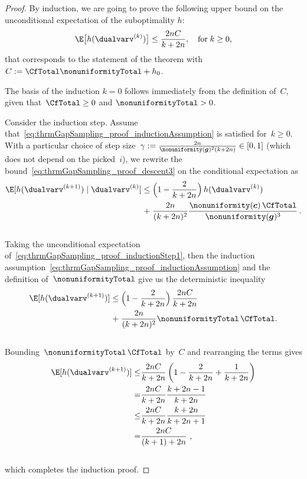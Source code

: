 \documentclass{article}
\begin{document}
\begin{proof}
    By induction, we are going to prove the following upper bound on the unconditional expectation of the suboptimality $h$:\\[-0.2cm]
    \begin{equation}
    \label{eq:thrmGapSampling_proof_inductionAssumption}
    \E \big[ h(\dualvarv^{(k)}) \big] \leq \frac{2n C}{k+2n} , \quad \text{for\;$k\geq0$,}
    \end{equation}
    that corresponds to the statement of the theorem with~$C:= \CfTotal \nonuniformityTotal + h_0$.
    
    The basis of the induction $k=0$ follows immediately from the definition of~$C$, given that~$\CfTotal \geq 0$ and $\nonuniformityTotal > 0$.
    
    Consider the induction step.
    Assume that~\eqref{eq:thrmGapSampling_proof_inductionAssumption} is satisfied for~$k \geq 0$.  
    With a particular choice of step size~$\gamma:= \frac{2n}{\nonuniformity( \bm{g} )^2 (k+2n)} \in[0,1]$ (which does not depend on the picked~$i$), we rewrite the bound~\eqref{eq:thrmGapSampling_proof_descent3} on the conditional expectation as\\[-0.4cm]
    \begin{align}
    \notag \E [ h(\dualvarv^{(k+1)}) \mid \dualvarv^{(k)}] 
    \le\;& 
    \Bigl( 1 - \frac{2}{k+2n} \Bigr) \, h(\dualvarv^{(k)}) 
    \\
    \label{eq:thrmGapSampling_proof_inductionStep1}
    +\;&
    \frac{2n}{(k+2n)^2} \frac{ \nonuniformity( \bm{c} ) \,\CfTotal }{\nonuniformity( \bm{g} )^3} \, .
    \end{align}\\[-0.3cm]
    Taking the unconditional expectation of~\eqref{eq:thrmGapSampling_proof_inductionStep1}, then the induction assumption~\eqref{eq:thrmGapSampling_proof_inductionAssumption} and the definition of~$\nonuniformityTotal$ give us the deterministic inequality\\[-0.6cm]
    \begin{align}
    \notag \E [ h(\dualvarv^{(k+1)}) ] 
    \le\;& 
    \Bigl( 1 - \frac{2}{k+2n} \Bigr) \, \frac{2nC}{k+2n} 
    \\
    \label{eq:thrmGapSampling_proof_inductionStep2}
    +\;&
    \frac{2n}{(k+2n)^2} \nonuniformityTotal \,\CfTotal.
    \end{align}\\[-0.3cm]
    Bounding~$\nonuniformityTotal \,\CfTotal$ by~$C$ and rearranging the terms gives\\[-0.4cm]
    \begin{align}
    \notag \E [ h(\dualvarv^{(k+1)}) ]  
    \le&
    \frac{2nC}{k+2n} \left(1 - \frac{2}{k+2n} + \frac{1}{k+2n}\right)
    \\
    \notag=&
    \frac{2nC}{k+2n} \frac{k+2n-1}{k+2n}
    \\
    \notag\le&
    \frac{2nC}{k+2n} \frac{k+2n}{k+2n+1}
    \\
    \notag=&
    \frac{2nC}{(k+1)+2n} \ ,
    \end{align}\\[-0.3cm]
    which completes the induction proof.  
\end{proof}
\end{document}
